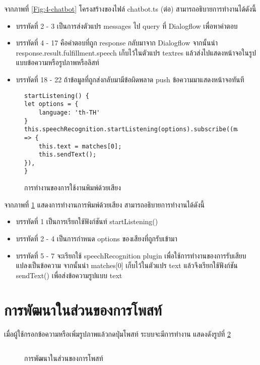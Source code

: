 \begin{enumerate}
	จากภาพที่ \ref{Fig:4-chatbot} โครงสร้างของไฟล์ chatbot.ts (ต่อ) สามารถอธิบายการทำงานได้ดังนี้
	\begin{itemize}[label={--}]
	\item บรรทัดที่ 2 - 3 เป็นการส่งตัวแปร messages ไป query ที่ Dialogflow เพื่อหาคำตอบ
	\item บรรทัดที่ 4 - 17 คือคำตอบที่ถูก response กลับมาจาก Dialogflow จากนั้นนำ response.result.fulfillment.speech เก็บไว้ในตัวแปร textres แล้วส่งไปแสดงหน้าจอในรูปแบบข้อความหรือรูปภาพหรือลิสท์
	\item บรรทัดที่ 18 - 22 ถ้าข้อมูลที่ถูกส่งกลับมามีข้อผิดพลาด push ข้อความมาแสดงหน้าจอทันที
	\end{itemize}
	\newpage

	\begin{figure}[H]
		{\begin{lstlisting}
startListening() {
let options = {
	language: 'th-TH'
}
this.speechRecognition.startListening(options).subscribe((matches) => {
	this.text = matches[0];
	this.sendText();
}),
}
		\end{lstlisting}}
		\caption{การทำงานของการใช้งานพิมพ์ด้วยเสียง}
		\label{Fig:4-chatbotsound}
	\end{figure}
	\newline
	จากภาพที่ \ref{Fig:4-chatbotsound} แสดงการทำงานการพิมพ์ด้วยเสียง สามารถอธิบายการทำงานได้ดังนี้
	\begin{itemize}[label={--}]
	\item บรรทัดที่ 1 เป็นการเรียกใช้ฟังก์ชันท์ startListening()
	\item บรรทัดที่ 2 - 4 เป็นการกำหนด options ของเสียงที่ถูกรับเข้ามา
	\item บรรทัดที่ 5 - 7 จะเรียกใช้ speechRecognition plugin เพื่อใช้การทำงานของการรับเสียบแปลงเป็นข้อความ จากนั้นนำ
	matches[0] เก็บไว้ในตัวแปร text แล้วจึงเรียกใช้ฟังก์ชัน sendText() เพื่อส่งข้อความรูปแบบ text
	\end{itemize}
\end{enumerate}
\newpage


\section{การพัฒนาในส่วนของการโพสท์}
เมื่อผู้ใช้กรอกข้อความหรือเพิ่มรูปภาพแล้วกดปุ่มโพสท์ ระบบจะมีการทำงาน แสดงดังรูปที่ \ref{Fig:4-addpost}

\begin{figure}[H]
{\lstset{language=Pascal}
\begin{lstlisting}

\end{lstlisting}}
\caption{การพัฒนาในส่วนของการโพสท์}
\label{Fig:4-addpost}
\end{figure}
\newpage

